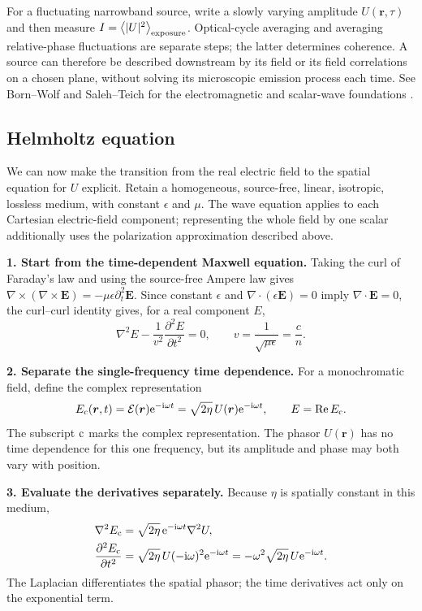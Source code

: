 \documentclass[11pt,a4paper]{article}
\numberwithin{equation}{section}
\newcommand{\ii}{\mathrm{i}}
\newcommand{\ee}{\mathrm{e}}
\newcommand{\vct}[1]{\bm{#1}}
\newcommand{\avg}[1]{\left\langle #1\right\rangle}
\newcommand{\Real}{\operatorname{Re}}
\begin{document}
For a fluctuating narrowband source, write a slowly varying amplitude
$U(\vct r,\tau)$ and then measure
$I=\avg{|U|^2}_{\rm exposure}$. Optical-cycle averaging and averaging
relative-phase fluctuations are separate steps; the latter determines
coherence. A source can therefore be described downstream by its field
or its field correlations on a chosen plane, without solving its
microscopic emission process each time. See Born--Wolf and
Saleh--Teich for the electromagnetic and scalar-wave foundations
\cite{bw,st}.

\subsection{Helmholtz equation}
\label{sec:helmholtz-derivation}
We can now make the transition from the real electric field to the
spatial equation for $U$ explicit. Retain a homogeneous, source-free,
linear, isotropic, lossless medium, with constant $\epsilon$ and $\mu$.
The wave equation applies to each Cartesian electric-field component;
representing the whole field by one scalar additionally uses the
polarization approximation described above.

\textbf{1. Start from the time-dependent Maxwell equation.}
Taking the curl of Faraday's law and using the source-free Ampere law
gives $\nabla\times(\nabla\times\vct E)
=-\mu\epsilon\partial_t^2\vct E$. Since constant $\epsilon$ and
$\nabla\cdot(\epsilon\vct E)=0$ imply $\nabla\cdot\vct E=0$, the
curl--curl identity gives, for a real component $E$,
\begin{equation}
\boxed{\nabla^2E-\frac{1}{v^2}\frac{\partial^2E}{\partial t^2}=0,}
\qquad v=\frac{1}{\sqrt{\mu\epsilon}}=\frac{c}{n}.
\label{eq:real-scalar-wave}
\end{equation}

\textbf{2. Separate the single-frequency time dependence.}
For a monochromatic field, define the complex representation
\begin{equation}
E_{\rm c}(\vct r,t)=\mathcal E(\vct r)\ee^{-\ii\omega t}
=\sqrt{2\eta}\,U(\vct r)\ee^{-\ii\omega t},
\qquad E=\Real E_{\rm c}.
\label{eq:helmholtz-ansatz}
\end{equation}
The subscript $\rm c$ marks the complex representation. The phasor $U(\vct r)$
has no time dependence for this one frequency, but its amplitude and
phase may both vary with position.

\textbf{3. Evaluate the derivatives separately.}
Because $\eta$ is spatially constant in this medium,
\begin{align}
\nabla^2E_{\rm c}
&=\sqrt{2\eta}\,\ee^{-\ii\omega t}\nabla^2U,\notag\\
\frac{\partial^2 E_{\rm c}}{\partial t^2}
&=\sqrt{2\eta}\,U(-\ii\omega)^2\ee^{-\ii\omega t}
=-\omega^2\sqrt{2\eta}\,U\ee^{-\ii\omega t}.
\label{eq:helmholtz-derivatives}
\end{align}
The Laplacian differentiates the spatial phasor; the time derivatives
act only on the exponential term.
\end{document}
